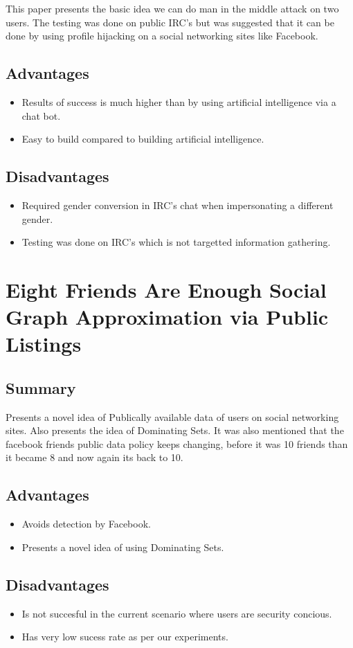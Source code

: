 This paper presents the basic idea we can do man in the middle attack on two
users. The testing was done on public IRC’s but was suggested that it can
be done by using profile hijacking on a social networking sites like Facebook.

\subsection{Advantages}
\begin{itemize}
\item{Results of success is much higher than by using artificial intelligence via a chat bot.}
\item{Easy to build compared to building artificial intelligence.}

\end{itemize}

\subsection{Disadvantages}
\begin{itemize}
\item{Required gender conversion in IRC’s chat when impersonating a different gender.}
\item{Testing was done on IRC’s which is not targetted information gathering.}

\end{itemize}



\section{Eight Friends Are Enough Social Graph Approximation via Public Listings}
\subsection{Summary}

Presents a novel idea of Publically available data of users on social networking
sites. Also presents the idea of Dominating Sets. It was also mentioned that
the facebook friends public data policy keeps changing, before it was 10
friends than it became 8 and now again its back to 10.


\subsection{Advantages}
\begin{itemize}
\item{Avoids detection by Facebook.}
\item{Presents a novel idea of using Dominating Sets.}

\end{itemize}

\subsection{Disadvantages}
\begin{itemize}
\item{Is not succesful in the current scenario where users are security concious.}
\item{Has very low sucess rate as per our experiments.}

\end{itemize}